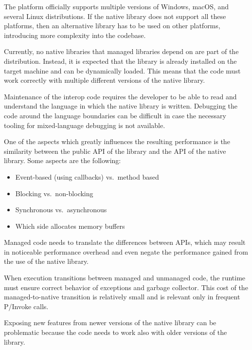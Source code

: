\begin{itemize}

   The \dotnet{} platform officially supports
    multiple versions of Windows, macOS, and several Linux distributions. If the native library does
    not support all these platforms, then an alternative library has to be used on other platforms,
    introducing more complexity into the codebase.

   Currently, no native libraries that managed
    \dotnet{} libraries depend on are part of the \dotnet{} distribution. Instead, it is expected
    that the library is already installed on the target machine and can be dynamically loaded. This
    means that the \dotnet{} code must work correctly with multiple different versions of the native
    library.

   Maintenance of the interop code requires the developer to be able to
    read and understand the language in which the native library is written. Debugging the code
    around the language boundaries can be difficult in case the necessary tooling for mixed-language
    debugging is not available.

   One of the aspects which greatly influences the resulting performance is
    the similarity between the public API of the \dotnet{} library and the API of the native
    library. Some aspects are the following:

    \begin{itemize}
      \item Event-based (using callbacks) vs.\ method based
      \item Blocking vs.\ non-blocking
      \item Synchronous vs.\ asynchronous
      \item Which side allocates memory buffers
    \end{itemize}

    Managed code needs to translate the differences between APIs, which may result in noticeable
    performance overhead and even negate the performance gained from the use of the native library.

   When execution transitions between managed and unmanaged code,
    the runtime must ensure correct behavior of exceptions and garbage collector. This cost of the
    managed-to-native transition is relatively small and is relevant only in frequent P/Invoke
    calls.

   Exposing new features from newer versions of the native library can
    be problematic because the code needs to work also with older versions of the library.

\end{itemize}

